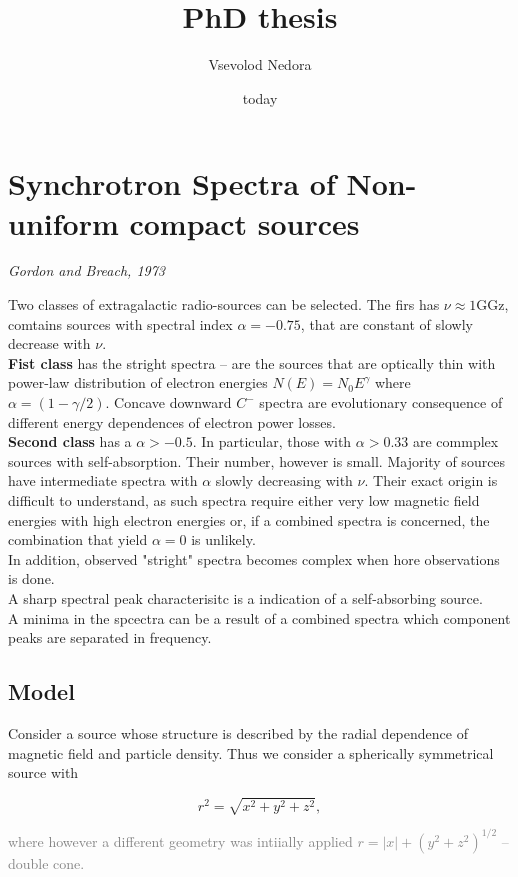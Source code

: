 \documentclass[11pt,a4paper,headinclude=true,DIV=14,BCOR=8mm,chapterprefix,listof=totoc,twoside,openright,abstracton]{scrbook}
\title{PhD thesis}
\author{Vsevolod Nedora}
\date{today}
\begin{document}
\section{Synchrotron Spectra of Non-uniform compact sources}
\textit{Gordon and Breach, 1973}


Two classes of extragalactic radio-sources can be selected. The firs has $\nu\approx 1$GGz, comtains sources with spectral index $\alpha=-0.75$, that are constant of slowly decrease with $\nu$. \\
\textbf{Fist class} has the stright spectra -- are the sources that are optically thin with power-law distribution of electron energies $N(E) = N_0 E^{\gamma}$ where $\alpha = (1-\gamma/2)$. Concave downward $C^{-}$ spectra are evolutionary consequence of different energy dependences of electron power losses.\\
\textbf{Second class} has a $\alpha>-0.5$. In particular, those with $\alpha>0.33$ are commplex sources with self-absorption. Their number, however is small. Majority of sources have intermediate spectra with $\alpha$ slowly decreasing with $\nu$. Their exact origin is difficult to understand, as such spectra require either very low magnetic field energies with high electron energies or, if a combined spectra is concerned, the combination that yield $\alpha=0$ is unlikely. \\

In addition, observed "stright" spectra becomes complex when hore observations is done. \\

A sharp spectral peak characterisitc is a indication of a self-absorbing source. \\

A minima in the spcectra can be a result of a combined spectra which component peaks are separated in frequency.


\subsection{Model}

Consider a source whose structure is described by the radial dependence of magnetic field and particle density. Thus we consider a spherically symmetrical source with 

\begin{equation}
    r^2 = \sqrt{x^2 + y^2 + z^2},
\end{equation}

\textcolor{gray}{where however a different geometry was intiially applied $r = |x| + (y^2 + z^2)^{1/2}$ -- double cone.}
\end{document}

